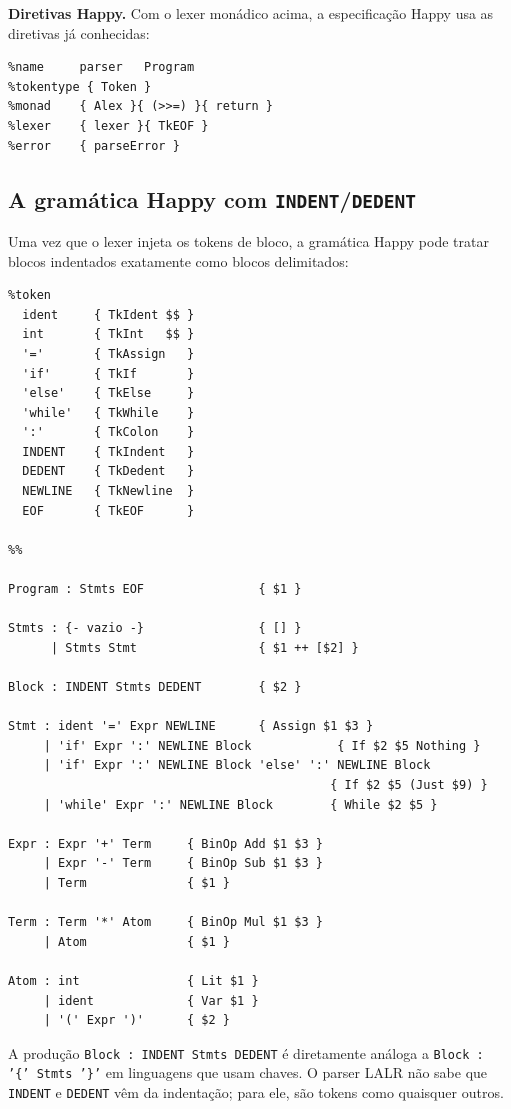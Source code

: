 \textbf{Diretivas Happy.} Com o lexer monádico acima, a
especificação Happy usa as diretivas já conhecidas:

\begin{verbatim}
%name     parser   Program
%tokentype { Token }
%monad    { Alex }{ (>>=) }{ return }
%lexer    { lexer }{ TkEOF }
%error    { parseError }
\end{verbatim}

\subsection{A gramática Happy com \texttt{INDENT}/\texttt{DEDENT}}

Uma vez que o lexer injeta os tokens de bloco, a gramática Happy
pode tratar blocos indentados exatamente como blocos delimitados:

\begin{verbatim}
%token
  ident     { TkIdent $$ }
  int       { TkInt   $$ }
  '='       { TkAssign   }
  'if'      { TkIf       }
  'else'    { TkElse     }
  'while'   { TkWhile    }
  ':'       { TkColon    }
  INDENT    { TkIndent   }
  DEDENT    { TkDedent   }
  NEWLINE   { TkNewline  }
  EOF       { TkEOF      }

%%

Program : Stmts EOF                { $1 }

Stmts : {- vazio -}                { [] }
      | Stmts Stmt                 { $1 ++ [$2] }

Block : INDENT Stmts DEDENT        { $2 }

Stmt : ident '=' Expr NEWLINE      { Assign $1 $3 }
     | 'if' Expr ':' NEWLINE Block            { If $2 $5 Nothing }
     | 'if' Expr ':' NEWLINE Block 'else' ':' NEWLINE Block
                                             { If $2 $5 (Just $9) }
     | 'while' Expr ':' NEWLINE Block        { While $2 $5 }

Expr : Expr '+' Term     { BinOp Add $1 $3 }
     | Expr '-' Term     { BinOp Sub $1 $3 }
     | Term              { $1 }

Term : Term '*' Atom     { BinOp Mul $1 $3 }
     | Atom              { $1 }

Atom : int               { Lit $1 }
     | ident             { Var $1 }
     | '(' Expr ')'      { $2 }
\end{verbatim}

A produção \texttt{Block : INDENT Stmts DEDENT} é diretamente
análoga a \texttt{Block : '\{' Stmts '\}'} em linguagens que usam
chaves. O parser LALR não sabe que \texttt{INDENT} e \texttt{DEDENT}
vêm da indentação; para ele, são tokens como quaisquer outros.

